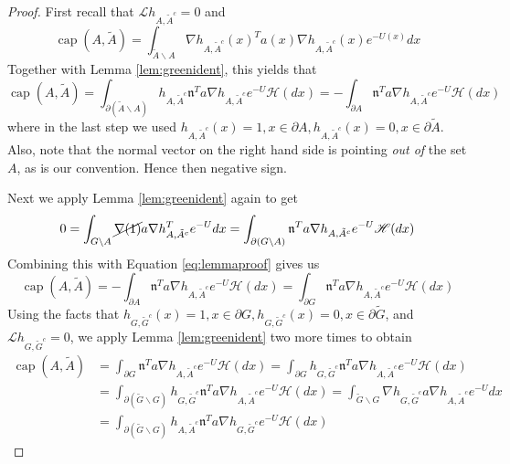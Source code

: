 \documentclass[nofootinbib,english, aip, jcp, priprint, graphicx,floatfix]{revtex4-1}
\newcommand{\tmop}[1]{\ensuremath{\operatorname{#1}}}
\theoremstyle{plain}
\theoremstyle{definition}
\theoremstyle{plain}
\newcommand{\normal}{{\mathfrak{n}}}
\newcommand{\hausdorffmeasure}{\mathscr{H}(dx)}
\begin{document}
\begin{proof}First recall that $\mathcal{L} h_{A, \tilde{A}^c} = 0$ and
\begin{equation*}
	\tmop{cap}(A,\tilde A) = \int_{\tilde A \backslash A} \nabla h_{A, \tilde{A}^c} (x)^T a(x) \nabla h_{A, \tilde{A}^c} (x) e^{-U(x)} dx
\end{equation*}
Together with Lemma \ref{lem:greenident}, this yields that
\begin{equation}\label{eq:lemmaproof}
\tmop{cap}(A,\tilde A)  = \int_{\partial (\tilde A \backslash A)}  h_{A, \tilde{A}^c} \normal^T a  \nabla h_{A, \tilde{A}^c} e^{- U } \hausdorffmeasure = -\int_{\partial A}  \normal^T a  \nabla h_{A, \tilde{A}^c} e^{- U } \hausdorffmeasure
\end{equation}
where in the last step we used $h_{A,\tilde A^c}(x)=1,x\in \partial A,h_{A,\tilde A^c}(x)=0,x\in \partial \tilde A$.  Also, note that the normal vector on the right hand side is pointing {\em out of} the set $A$, as is our convention. Hence then negative sign.

Next we apply Lemma \ref{lem:greenident} again to get
\begin{align*}
	0 = \int_{G \backslash A} \cancel{\nabla (1)} a \nabla h_{A,\tilde A^c}^T e^{- U } dx = \int_{\partial (G\backslash A)} \normal^T a  \nabla h_{A,\tilde A^c} e^{- U } \hausdorffmeasure
\end{align*}
Combining this with Equation \ref{eq:lemmaproof} gives us
\begin{equation}
\label{eqn:cor}
\tmop{cap}(A,\tilde A)  = -\int_{\partial A}  \normal^T a  \nabla h_{A, \tilde{A}^c} e^{- U } \hausdorffmeasure = \int_{\partial G}  \normal^T a  \nabla h_{A, \tilde{A}^c} e^{- U } \hausdorffmeasure
\end{equation}
Using the facts that $h_{G,\tilde G^c}(x)=1,x\in \partial G,h_{G,\tilde G^c}(x)=0,x\in \partial \tilde G$, and $\mathcal{L} h_{G, \tilde G^c} = 0$, we apply Lemma \ref{lem:greenident} two more times to obtain 
\begin{align*}
	\tmop{cap}(A,\tilde A)  &= \int_{\partial G}  \normal^T a  \nabla h_{A, \tilde{A}^c} e^{- U } \hausdorffmeasure = \int_{\partial G}  h_{G, \tilde{G}^c} \normal^T a   \nabla h_{A, \tilde{A}^c} e^{- U } \hausdorffmeasure\\
				&= \int_{\partial (\tilde G \backslash G)}  h_{G, \tilde{G}^c} \normal^T a   \nabla h_{A, \tilde{A}^c} e^{- U } \hausdorffmeasure 
				= \int_{\tilde G \backslash G}  \nabla h_{G, \tilde{G}^c} a \nabla h_{A, \tilde{A}^c} e^{- U } dx\\
				&= \int_{\partial (\tilde G \backslash G)}  h_{A, \tilde{A}^c}    \normal^T a  \nabla h_{G, \tilde{G}^c} e^{- U } \hausdorffmeasure
\end{align*}
\end{proof}
\end{document}
